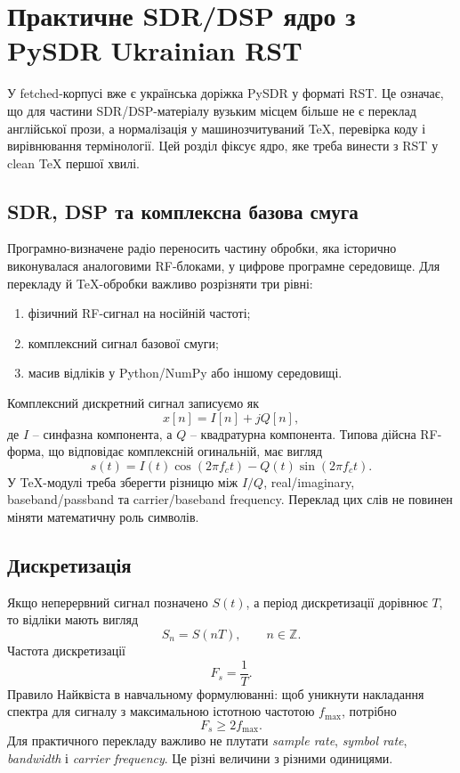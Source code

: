 
\chapter{Практичне SDR/DSP ядро з PySDR Ukrainian RST}
\label{chap:pysdr_rst_tex_core}

У fetched-корпусі вже є українська доріжка PySDR у форматі RST. Це означає, що для частини SDR/DSP-матеріалу вузьким місцем більше не є переклад англійської прози, а нормалізація у машинозчитуваний TeX, перевірка коду і вирівнювання термінології. Цей розділ фіксує ядро, яке треба винести з RST у clean TeX першої хвилі.

\section{SDR, DSP та комплексна базова смуга}
Програмно-визначене радіо переносить частину обробки, яка історично виконувалася аналоговими RF-блоками, у цифрове програмне середовище. Для перекладу й TeX-обробки важливо розрізняти три рівні:
\begin{enumerate}
\item фізичний RF-сигнал на носійній частоті;
\item комплексний сигнал базової смуги;
\item масив відліків у Python/NumPy або іншому середовищі.
\end{enumerate}

Комплексний дискретний сигнал записуємо як
\begin{equation}
 x[n] = I[n] + j Q[n],
\end{equation}
де $I$ -- синфазна компонента, а $Q$ -- квадратурна компонента. Типова дійсна RF-форма, що відповідає комплексній огинальній, має вигляд
\begin{equation}
 s(t) = I(t)\cos(2\pi f_c t) - Q(t)\sin(2\pi f_c t).
\end{equation}
У TeX-модулі треба зберегти різницю між $I/Q$, real/imaginary, baseband/passband та carrier/baseband frequency. Переклад цих слів не повинен міняти математичну роль символів.

\section{Дискретизація}
Якщо неперервний сигнал позначено $S(t)$, а період дискретизації дорівнює $T$, то відліки мають вигляд
\begin{equation}
 S_n = S(nT), \qquad n\in\mathbb{Z}.
\end{equation}
Частота дискретизації
\begin{equation}
 F_s = \frac{1}{T}.
\end{equation}
Правило Найквіста в навчальному формулюванні: щоб уникнути накладання спектра для сигналу з максимальною істотною частотою $f_{\max}$, потрібно
\begin{equation}
 F_s \ge 2f_{\max}.
\end{equation}
Для практичного перекладу важливо не плутати \emph{sample rate}, \emph{symbol rate}, \emph{bandwidth} і \emph{carrier frequency}. Це різні величини з різними одиницями.

